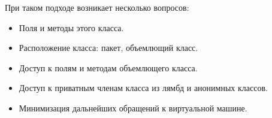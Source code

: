 \begin{frame}
\frametitle{\insertsection} 
\framesubtitle{\insertsubsection}
При таком подходе возникает несколько вопросов:
\begin{itemize}
	\item Поля и методы этого класса.
	
	\item Расположение класса: пакет, объемлющий класс.
	
	\item Доступ к полям и методам объемлющего класса.

	\item Доступ к приватным членам класса из лямбд и анонимных классов.

	\item Минимизация дальнейших обращений к виртуальной машине.
\end{itemize}

\inputminted{java}{code/EvalClass.java}
\end{frame}
